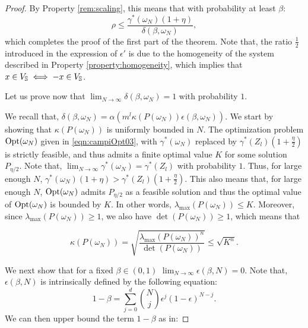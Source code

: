 \begin{proof}
By Property \ref{rem:scaling}, this means that with probability at least $\beta$:
$$\rho \leq \frac{\gamma^{*}(\omega_N) (1 + \eta)}{\delta(\beta, \omega_N)},$$
which completes the proof of the first part of the theorem. Note that, the ratio $\frac{1}{2}$ introduced in the expression of $\epsilon'$ is due to the homogeneity of the system described in Property \ref{property:homogeneity}, which implies that $x \in V_{\mathbb{S}} \iff -x \in V_{\mathbb{S}}$. 


%

Let us prove now that $\lim_{N \to \infty} \delta(\beta, \omega_N) = 1$ with probability $1$.

We recall that, $\delta(\beta, \omega_N) = \alpha(m^l \kappa(P(\omega_N)) \epsilon(\beta, \omega_N))$. We start by showing that $\kappa(P(\omega_N))$  is uniformly bounded in $N$. The optimization problem $\text{Opt}(\omega_N)$ given in \eqref{eqn:campiOpt03}, with $\gamma^{*}(\omega_N)$ replaced by $\gamma^{*}(Z_l)(1+\frac{\eta}{2})$ is strictly feasible, and thus admits a finite optimal value $K$ for some solution $P_{\eta/2}$. Note that, $\lim_{N \to \infty} \gamma^{*}(\omega_N)= \gamma^{*}(Z_l)$ with probability $1$. Thus, for large enough $N$, \mbox{$\gamma^{*}(\omega_N)(1+\eta) > \gamma^{*}(Z_l)(1+\frac{\eta}{2})$.} This also means that, for large enough $N$, $\text{Opt}(\omega_N)$ admits $P_{\eta/2}$ as a feasible solution and thus the optimal value of $\text{Opt}(\omega_N)$ is bounded by $K.$ In other words, \mbox{$\lambda_{\max}(P({\omega_N})) \leq K$.} Moreover, since  
$\lambda_{\max}(P(\omega_N))\geq 1$, we also have \mbox{$\det(P(\omega_N)) \geq 1$,} which means that

\begin{equation}\label{kappa}
\kappa(P(\omega_N)) = \sqrt{\frac{\lambda_{\max}(P(\omega_N))^n}{\det(P(\omega_N))}} \leq \sqrt{K^n}.
\end{equation}

We next show that for a fixed $\beta \in (0,1)$ $\lim_{N \to \infty} \epsilon(\beta, N) = 0.$ Note that, $\epsilon(\beta, N)$ is intrinsically defined by the following equation:
$$1-\beta = \sum_{j=0}^d {{N}\choose{j}} \epsilon^j (1-\epsilon)^{N-j}.$$
We can then upper bound the term $1-\beta$ as in:


\end{proof}
